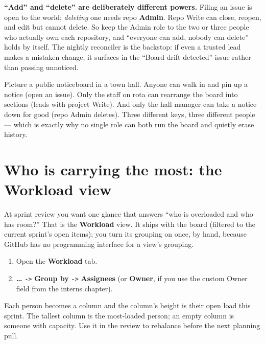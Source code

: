 \documentclass[11pt,a4paper]{report}
\newcommand{\code}[1]{\texttt{#1}}
\begin{document}
\begin{gotcha}
\textbf{``Add'' and ``delete'' are deliberately different powers.} Filing an issue
is open to the world; \emph{deleting} one needs repo \textbf{Admin}. Repo Write can
close, reopen, and edit but cannot delete. So keep the Admin role to the two or
three people who actually own each repository, and ``everyone can add, nobody can
delete'' holds by itself. The nightly reconciler is the backstop: if even a
trusted lead makes a mistaken change, it surfaces in the ``Board drift detected''
issue rather than passing unnoticed.
\end{gotcha}

\begin{plainenglish}
Picture a public noticeboard in a town hall. Anyone can walk in and pin up a
notice (open an issue). Only the staff on rota can rearrange the board into
sections (leads with project Write). And only the hall manager can take a notice
down for good (repo Admin deletes). Three different keys, three different people
--- which is exactly why no single role can both run the board and quietly erase
history.
\end{plainenglish}

\chapter{Who is carrying the most: the Workload view}

At sprint review you want one glance that answers ``who is overloaded and who has
room?'' That is the \textbf{Workload} view. It ships with the board (filtered to
the current sprint's open items); you turn its grouping on once, by hand, because
GitHub has no programming interface for a view's grouping.

\begin{enumerate}[leftmargin=1.6em,itemsep=3pt]
  \item Open the \textbf{Workload} tab.
  \item \textbf{\ldots} \code{->} \textbf{Group by} \code{->} \textbf{Assignees}
        (or \textbf{Owner}, if you use the custom Owner field from the interns
        chapter).
\end{enumerate}

Each person becomes a column and the column's height is their open load this
sprint. The tallest column is the most-loaded person; an empty column is someone
with capacity. Use it in the review to rebalance before the next planning pull.
\end{document}

